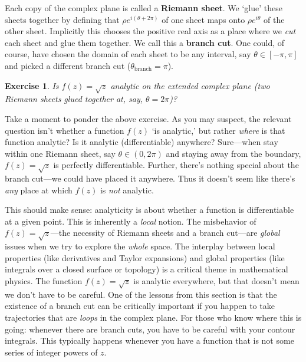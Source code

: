 \documentclass[
  11pt,
	colorful,
	raggedright,
]{tufte-style-thesis-flip}
\newtheorem{exercise}{Exercise}[section]
\begin{document}
Each copy of the complex plane is called a \textbf{Riemann sheet}. We `glue' these sheets together by defining that $\rho e^{i(\theta+2\pi)}$ of one sheet maps onto $\rho e^{i\theta}$ of the other sheet. Implicitly this chooses the positive real axis as a place where we \emph{cut} each sheet and glue them together. We call this a \textbf{branch cut}. One could, of course, have chosen the domain of each sheet to be any interval, say $\theta \in [-\pi,\pi]$ and picked a different branch cut ($\theta_\text{branch} = \pi$). 
\begin{exercise}
Is $f(z)=\sqrt{z}$ analytic on the extended complex plane (two Riemann sheets glued together at, say, $\theta=2\pi$)?
\end{exercise}
Take a moment to ponder the above exercise. As you may suspect, the relevant question isn't whether a function $f(z)$ `is analytic,' but rather \emph{where} is that function analytic? Is it analytic (differentiable) anywhere? Sure---when stay within one Riemann sheet, say $\theta\in (0,2\pi)$ and staying away from the boundary, $f(z)=\sqrt{z}$ is perfectly differentiable. Further, there's nothing special about the branch cut---we could have placed it anywhere. Thus it doesn't seem like there's \emph{any} place at which $f(z)$ is \emph{not} analytic. 

This should make sense: analyticity is about whether a function is differentiable at a given point. This is inherently a \emph{local} notion. The misbehavior of $f(z)=\sqrt{z}$---the necessity of Riemann sheets and a branch cut---are \emph{global} issues when we try to explore the \emph{whole} space. The interplay between local properties (like derivatives and Taylor expansions) and global properties (like integrals over a closed surface or topology) is a critical theme in mathematical physics. The function $f(z) = \sqrt{z}$ is analytic everywhere, but that doesn't mean we don't have to be careful. One of the lessons from this section is that the existence of a branch cut can be critically important if you happen to take trajectories that are \emph{loops} in the complex plane. For those who know where this is going: whenever there are branch cuts, you have to be careful with your contour integrals. This typically happens whenever you have a function that is not some series of integer powers of $z$.
\end{document}
